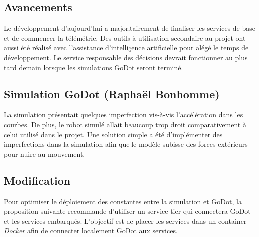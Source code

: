 \subsection{Avancements}
Le développement d'aujourd'hui a majoritairement de finaliser les services de base et de commencer la télémétrie.
Des outils à utilisation secondaire au projet ont aussi été réalisé avec l'assistance d'intelligence artificielle pour alégé le temps de développement.
Le service responsable des décisions devrait fonctionner au plus tard demain lorsque les simulations GoDot seront terminé.

\subsection{Simulation GoDot (Raphaël Bonhomme)}
La simulation présentait quelques imperfection vis-à-vis l'accélération dans les courbes.
De plus, le robot simulé allait beaucoup trop droit comparativement à celui utilisé dans le projet.
Une solution simple a été d'implémenter des imperfections dans la simulation afin que le modèle subisse des forces extérieurs pour nuire au mouvement.

\subsection{Modification}
Pour optimiser le déploiement des constantes entre la simulation et GoDot, la proposition suivante recommande d'utiliser un service tier qui connectera GoDot et les services embarqués.
L'objectif est de placer les services dans un container \textit{Docker} afin de connecter localement GoDot aux services.